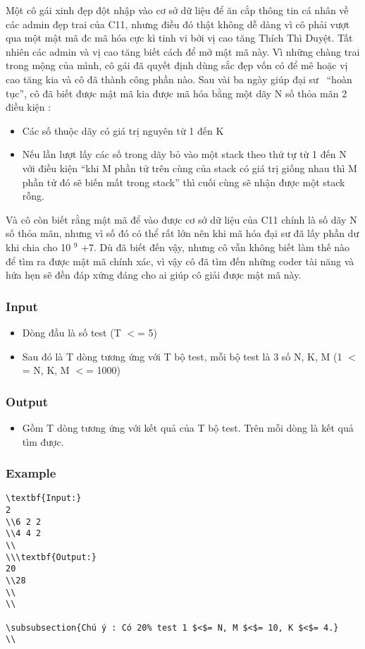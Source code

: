 



   Một cô gái xinh đẹp đột nhập vào cơ sở dữ liệu để ăn cắp thông tin cá nhân về các admin đẹp trai của C11, nhưng điều đó thật không dễ dàng vì cô phải vượt qua một mật mã đc mã hóa cực kì tinh vi bởi vị cao tăng Thích Thì Duyệt. Tất nhiên các admin và vị cao tăng biết cách để mở mật mã này. Vì những chàng trai trong mộng của mình, cô gái đã quyết định dùng sắc đẹp vốn có để mê hoặc vị cao tăng kia và cô đã thành công phần nào. Sau vài ba ngày giúp đại sư  “hoàn tục”, cô đã biết được mật mã kia được mã hóa bằng một dãy N số thỏa mãn 2 điều kiện :  
\begin{itemize}
	\item     Các số thuộc dãy có giá trị nguyên từ 1 đến K   
	\item     Nếu lần lượt lấy các số trong dãy bỏ vào một stack theo thứ tự từ 1 đến N  với điều kiện “khi M phần tử trên cùng của stack có giá trị giống nhau  thì M phần tử đó sẽ biến mất trong stack” thì cuối cùng sẽ nhận được một  stack rỗng.   
\end{itemize}

   Và cô còn biết rằng mật mã để vào được cơ sở dữ liệu của C11 chính là số dãy N số thỏa mãn, nhưng vì số đó có thể rất lớn nên khi mã hóa đại sư đã lấy phần dư khi chia cho 10   $^    9   $   +7. Dù đã biết đến vậy, nhưng cô vẫn không biết làm thế nào để tìm ra được mật mã chính xác, vì vậy cô đã tìm đến những coder tài năng và hứa hẹn sẽ đền đáp xứng đáng cho ai giúp cô giải được mật mã này.  

\subsubsection{   Input  }
\begin{itemize}
	\item     Dòng đầu là số test (T $<$= 5)   
	\item     Sau đó là T dòng tương ứng với T bộ test, mỗi bộ test là 3 số N, K, M (1 $<$= N, K, M $<$= 1000)   
\end{itemize}

\subsubsection{   Output  }
\begin{itemize}
	\item     Gồm T dòng tương ứng với kết quả của T bộ test. Trên mỗi dòng là kết quả tìm được.   
\end{itemize}

\subsubsection{   Example  }
\begin{verbatim}
\textbf{Input:}
2
\\6 2 2
\\4 4 2
\\
\\\textbf{Output:}
20
\\28 
\\
\\

\subsubsection{Chú ý : Có 20% test 1 $<$= N, M $<$= 10, K $<$= 4.}
\\\end{verbatim}